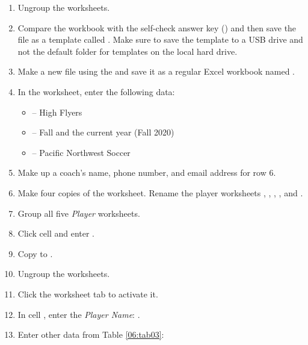 \begin{enumerate}
	\item Ungroup the worksheets.
	\item Compare the workbook with the self-check answer key () and then save the file as a template called . Make sure to save the  template to a USB drive and not the default folder for templates on the local hard drive.
	\item Make a new file using the  and save it as a regular Excel workbook named . 
	\item In the  worksheet, enter the following data:
	
	\begin{itemize}
		\item {} – High Flyers
		\item {} – Fall and the current year (\ie Fall 2020)
		\item {} – Pacific Northwest Soccer
	\end{itemize}
	
	\item Make up a coach's name, phone number, and email address for row $ 6 $.
	\item Make four copies of the  worksheet. Rename the player worksheets , , , , and .
	\item Group all five \textit{Player} worksheets.
	\item Click cell  and enter .
	\item Copy  to .
	\item Ungroup the worksheets.
	\item Click the  worksheet tab to activate it. 
	\item In cell , enter the \textit{Player Name}: . 
	\item Enter other data from Table \ref{06:tab03}:
\end{enumerate}

